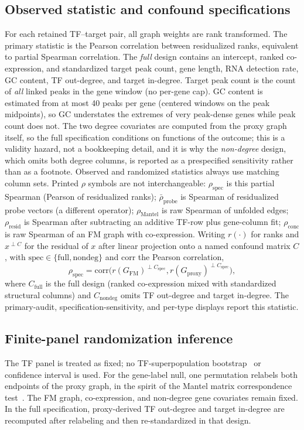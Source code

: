 \documentclass[fleqn,10pt,lineno]{wlpeerj}
\begin{document}
\subsection{Observed statistic and confound specifications}\label{sec:statistic}
For each retained TF--target pair, all graph weights are rank transformed. The primary statistic is
the Pearson correlation between residualized ranks, equivalent to partial Spearman correlation. The
\emph{full} design contains an intercept, ranked co-expression, and standardized target peak count,
gene length, RNA detection rate, GC content, TF out-degree, and target in-degree. Target peak count
is the count of \emph{all} linked peaks in the gene window (no per-gene cap). GC content is estimated
from at most 40 peaks per gene (centered windows on the peak midpoints), so GC understates the
extremes of very peak-dense genes while peak count does not. The two degree
covariates are computed from the proxy graph itself, so the full specification conditions on
functions of the outcome; this is a validity hazard, not a bookkeeping detail, and it is why the
\emph{non-degree} design, which omits both degree columns, is reported as a prespecified sensitivity rather than as a
footnote. Observed and randomized statistics always use matching column sets.
Printed $\rho$ symbols are not interchangeable:
$\rho_{\mathrm{spec}}$ is this partial Spearman (Pearson of residualized ranks);
$\bar{\rho}_{\mathrm{probe}}$ is Spearman of residualized probe vectors (a different operator);
$\rho_{\mathrm{Mantel}}$ is raw Spearman of unfolded edges;
$\rho_{\mathrm{resid}}$ is Spearman after subtracting an additive TF-row plus gene-column fit;
$\rho_{\mathrm{conc}}$ is raw Spearman of an FM graph with co-expression.
Writing $r(\cdot)$ for ranks and $x^{\perp C}$ for the residual of $x$ after linear projection onto a named confound matrix $C$,
with $\mathrm{spec}\in\{\mathrm{full},\mathrm{nondeg}\}$ and $\mathrm{corr}$ the Pearson correlation,
\begin{equation}
\label{eq:partial-rho}
\rho_{\mathrm{spec}}
=
\mathrm{corr}\bigl(r(G_{\mathrm{FM}})^{\perp C_{\mathrm{spec}}},
r(G_{\mathrm{proxy}})^{\perp C_{\mathrm{spec}}}\bigr),
\end{equation}
where $C_{\mathrm{full}}$ is the full design (ranked co-expression mixed with standardized structural columns) and $C_{\mathrm{nondeg}}$ omits TF out-degree and target in-degree.
The primary-audit, specification-sensitivity, and per-type displays report this statistic.

\subsection{Finite-panel randomization inference}\label{sec:inference}
The TF panel is treated as fixed; no TF-superpopulation bootstrap~\citep{efron1993bootstrap} or
confidence interval is used. For
the gene-label null, one permutation relabels both endpoints of the proxy graph, in the spirit of the
Mantel matrix correspondence test~\citep{mantel1967}. The FM graph,
co-expression, and non-degree gene covariates remain fixed. In the full specification, proxy-derived
TF out-degree and target in-degree are recomputed after relabeling and then
re-standardized in that design.
\end{document}
